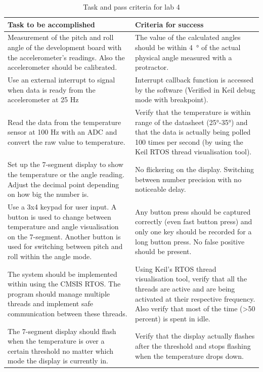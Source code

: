 \documentclass[12pt]{article}
\begin{document}
\begin{table}[!h]
\centering
\caption{Task and pass criteria for lab 4}
\label{Table_tasks}
\begin{tabular}{|p{0.5\linewidth}|p{0.5\linewidth}|}
\hline
\textbf{Task to be accomplished} & \textbf{Criteria for success} \\ \hline
Measurement of the pitch and roll angle of the development board with the accelerometer's readings. Also the accelerometer should be calibrated. & The value of the calculated angles should be within \SI{4}{\degree} of the actual physical angle measured with a protractor. \\ \hline
Use an external interrupt to signal when data is ready from the accelerometer at 25 Hz & Interrupt callback function is accessed by the software (Verified in Keil debug mode with breakpoint). \\ \hline
Read the data from the temperature sensor at 100 Hz with an ADC and convert the raw value to temperature. & Verify that the temperature is within range of the datasheet (25°-35°) and that the data is actually being polled 100 times per second (by using the Keil RTOS thread visualisation tool). \\ \hline
Set up the 7-segment display to show the temperature or the angle reading. Adjust the decimal point depending on how big the number is. & No flickering on the display. Switching between number precision with no noticeable delay. \\ \hline
Use a 3x4 keypad for user input. A button is used to change between temperature and angle visualisation on the 7-segment. Another button is used for switching between pitch and roll within the angle mode. & Any button press should be captured correctly (even fast button press) and only one key should be recorded for a long button press. No false positive should be present. \\ \hline
The system should be implemented within using the CMSIS RTOS. The program should manage multiple threads and implement safe communication between these threads. & Using Keil's RTOS thread visualisation tool, verify that all the threads are active and are being activated at their respective frequency. Also verify that most of the time (\textgreater 50 percent) is spent in idle. \\ \hline
The 7-segment display should flash when the temperature is over a certain threshold no matter which mode the display is currently in. & Verify that the display actually flashes after the threshold and stops flashing when the temperature drops down. \\ \hline
\end{tabular}
\end{table}
\end{document}
